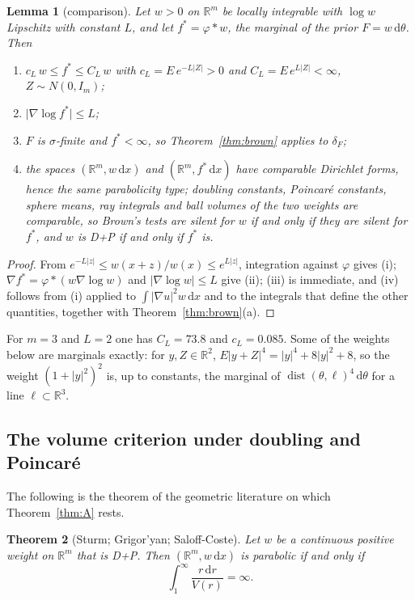 \documentclass[11pt]{amsart}
\newcommand{\R}{\mathbb{R}}
\newcommand{\dd}{\,\mathrm{d}}
\newcommand{\abs}[1]{\lvert #1\rvert}
\DeclareMathOperator{\dist}{dist}
\theoremstyle{plain}
\newtheorem{theorem}{Theorem}[section]
\newtheorem{lemma}[theorem]{Lemma}
\theoremstyle{definition}
\theoremstyle{remark}
\begin{document}
\begin{lemma}[comparison]\label{lem:lip}
Let $w>0$ on $\R^m$ be locally integrable with $\log w$ Lipschitz with constant
$L$, and let $f^*=\varphi*w$, the marginal of the prior $F=w\dd\theta$. Then
\begin{enumerate}[label=\textup{(\roman*)},leftmargin=2em,itemsep=1pt]
\item $c_L\,w\le f^*\le C_L\,w$ with $c_L=E\,e^{-L\abs Z}>0$ and
$C_L=E\,e^{L\abs Z}<\infty$, $Z\sim N(0,I_m)$;
\item $\abs{\nabla\log f^*}\le L$;
\item $F$ is $\sigma$-finite and $f^*<\infty$, so Theorem~\ref{thm:brown}
applies to $\delta_F$;
\item the spaces $(\R^m,w\dd x)$ and $(\R^m,f^*\dd x)$ have comparable Dirichlet
forms, hence the same parabolicity type; doubling constants, Poincar\'e
constants, sphere means, ray integrals and ball volumes of the two weights are
comparable, so Brown's tests are silent for $w$ if and only if they are silent
for $f^*$, and $w$ is D+P if and only if $f^*$ is.
\end{enumerate}
\end{lemma}

\begin{proof}
From $e^{-L\abs z}\le w(x+z)/w(x)\le e^{L\abs z}$, integration against
$\varphi$ gives (i); $\nabla f^*=\varphi*(w\nabla\log w)$ and
$\abs{\nabla\log w}\le L$ give (ii); (iii) is immediate, and (iv) follows from
(i) applied to $\int\abs{\nabla u}^2w\dd x$ and to the integrals that define the
other quantities, together with Theorem~\ref{thm:brown}(a).
\end{proof}

For $m=3$ and $L=2$ one has $C_L=73.8$ and $c_L=0.085$. Some of the weights
below are marginals exactly: for $y,Z\in\R^2$,
$E\abs{y+Z}^4=\abs y^4+8\abs y^2+8$, so the weight $(1+\abs y^2)^2$ is, up to
constants, the marginal of $\dist(\theta,\ell)^4\dd\theta$ for a line
$\ell\subset\R^3$.

\subsection{The volume criterion under doubling and Poincar\'e}
The following is the theorem of the geometric literature on which
Theorem~\ref{thm:A} rests.

\begin{theorem}[Sturm; Grigor'yan; Saloff-Coste]\label{thm:volume}
Let $w$ be a continuous positive weight on $\R^m$ that is D+P. Then
$(\R^m,w\dd x)$ is parabolic if and only if
\begin{equation}\label{eq:volume}
\int_1^\infty\frac{r\dd r}{V(r)}=\infty .
\end{equation}
\end{theorem}
\end{document}
